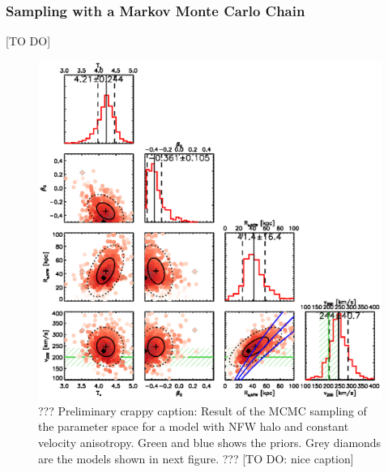\documentclass[useAMS,usenatbib]{mn2e}
\begin{document}
\subsubsection{Sampling with a Markov Monte Carlo Chain}

[TO DO]

\begin{figure}
\centering
\includegraphics[width=0.9\linewidth]{fig/B4_contour_plot_short.ps}
\caption{??? Preliminary crappy caption: Result of the MCMC sampling of the parameter space for a model with NFW halo and constant velocity anisotropy. Green and blue shows the priors. Grey diamonds are the models shown in next figure. ??? [TO DO: nice caption]}
\label{fig:???}
\end{figure}
\end{document}
